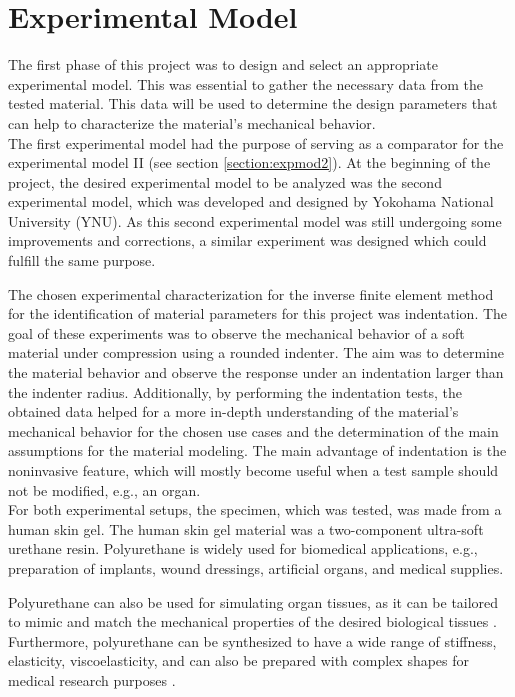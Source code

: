 
\chapter{Experimental Model} %
\label{Chapter3}

The first phase of this project was to design and select an appropriate 
experimental model. This was essential to gather the necessary data from the 
tested material. This data will be used to determine the design parameters 
that can help to characterize the material's mechanical behavior. \\

The first experimental model had the purpose of serving as a comparator for the experimental 
model II (see section \ref{section:expmod2}). At the beginning of the project, the desired experimental 
model to be analyzed was the second experimental model, which was developed and designed by Yokohama National 
University (YNU). As this second experimental model was still undergoing some improvements and corrections, a similar 
experiment was designed which could fulfill the same purpose.

The chosen experimental characterization for the inverse finite element method for 
 the identification of material parameters for this project was indentation.
The goal of these experiments was to observe the mechanical behavior of a soft material under 
compression using a rounded indenter. The aim was to determine the material behavior and 
observe the response under an indentation larger than the indenter radius. Additionally, 
by performing the indentation tests, the obtained 
data helped for a more in-depth understanding of the material's mechanical behavior for the chosen 
use cases and the determination of the main assumptions for the material modeling.
The main advantage of indentation is the noninvasive feature, which will mostly 
become useful when a test sample should not be modified, e.g., an organ.\\

For both experimental setups, the specimen, which was tested, was made from a human skin gel.
The human skin gel material was a two-component ultra-soft urethane resin.
Polyurethane is widely used for biomedical applications, e.g., preparation of implants, wound dressings, artificial 
organs, and medical supplies. 

Polyurethane can also be used for simulating organ tissues, as it can be tailored to mimic 
and match the mechanical properties of the desired biological tissues \cite{Wang2012}.  Furthermore, polyurethane can be 
synthesized to have a wide range of stiffness, elasticity, viscoelasticity, and can also be prepared 
with complex shapes for medical research purposes \cite{Joseph2018}. \\

